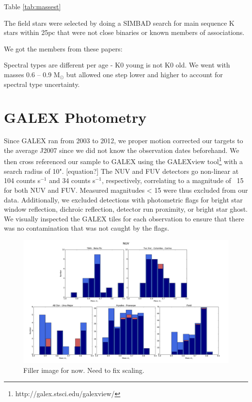 \documentclass[preprint2]{aastex62}
\begin{document}
Table \ref{tab:massest}


The field stars were selected by doing a SIMBAD search for main sequence K stars within 25pc that were not close binaries or known members of associations. 




We got the members from these papers:

Spectral types are different per age - K0 young is not K0 old. We went with masses 0.6 -- 0.9 M$_{\odot}$ but allowed one step lower and higher to account for spectral type uncertainty.





\section{GALEX Photometry}\label{sec:photometry}

Since GALEX ran from 2003 to 2012, we proper motion corrected our targets to the average J2007 since we did not know the observation dates beforehand. We then cross referenced our sample to GALEX using the GALEXview tool\footnote{http://galex.stsci.edu/galexview/} with a search radius of 10". [equation?] The NUV and FUV detectors go non-linear at 104 counts s$^{-1}$ and 34 counts s$^{-1}$, respectively, correlating to a magnitude of ~15 for both NUV and FUV. Measured magnitudes < 15 were thus excluded from our data. Additionally, we excluded detections with photometric flags for bright star window reflection, dichroic reflection, detector run proximity, or bright star ghost. We visually inspected the GALEX tiles for each observation to ensure that there was no contamination that was not caught by the flags. 


\begin{figure}
\centering
\includegraphics[width=.9\linewidth]{massdistributions_nuv.pdf}
\caption{Filler image for now. Need to fix scaling. \label{fig:massdistributions_nuv}}
\end{figure}
\end{document}
